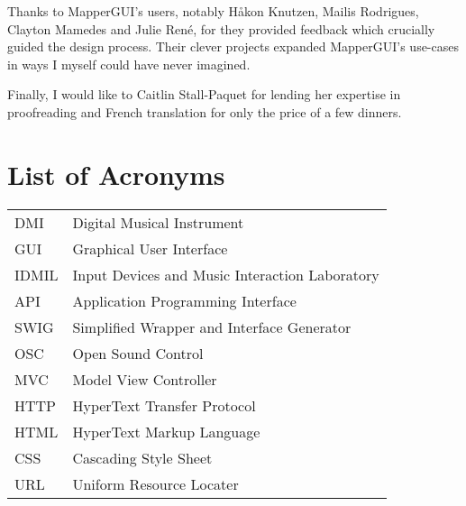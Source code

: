 \documentclass [12pt,letterpaper]{report}
\begin{document}
Thanks to MapperGUI's users, notably H\aa kon Knutzen, Mailis Rodrigues, Clayton Mamedes and Julie Ren\'e, for they provided feedback which crucially guided the design process. Their clever projects expanded MapperGUI's use-cases in ways I myself could have never imagined.

Finally, I would like to Caitlin Stall-Paquet for lending her expertise in proofreading and French translation for only the price of a few dinners.

\pagebreak


\tableofcontents
\listoffigures

\listoftables

\newpage
\chapter*{List of Acronyms}

\begin{longtable}{ll}
    DMI 	& 	Digital Musical Instrument\\
    GUI		& 	Graphical User Interface\\
    IDMIL &   Input Devices and Music Interaction Laboratory\\ 
    API   &   Application Programming Interface\\
    SWIG  &   Simplified Wrapper and Interface Generator\\
    OSC   &   Open Sound Control\\
    MVC   &   Model View Controller\\
    HTTP  &   HyperText Transfer Protocol\\
    HTML  &   HyperText Markup Language\\
    CSS   &   Cascading Style Sheet\\
    URL   &   Uniform Resource Locater\\
\end{longtable}

\cleardoublepage
{}

%
%
\typeout{}

%
\typeout{}

%
\typeout{}

%
\typeout{}

%
\typeout{}

%
\typeout{}




%
%

\typeout{}
    \renewcommand\refname{References}
    \nocite{*}
    
\end{document}
